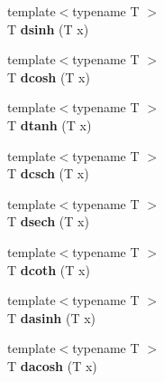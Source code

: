 \begin{DoxyCompactItemize}
\item 
\hypertarget{namespace_d_r_d_s_p_a09e0111902206a404a6de12cacdeea61}{{\footnotesize template$<$typename T $>$ }\\T {\bfseries dsinh} (T x)}\label{namespace_d_r_d_s_p_a09e0111902206a404a6de12cacdeea61}

\item 
\hypertarget{namespace_d_r_d_s_p_a5a63f17784421984c84b9dba3b51173f}{{\footnotesize template$<$typename T $>$ }\\T {\bfseries dcosh} (T x)}\label{namespace_d_r_d_s_p_a5a63f17784421984c84b9dba3b51173f}

\item 
\hypertarget{namespace_d_r_d_s_p_a46144486b16116ea73799ce0244b82ff}{{\footnotesize template$<$typename T $>$ }\\T {\bfseries dtanh} (T x)}\label{namespace_d_r_d_s_p_a46144486b16116ea73799ce0244b82ff}

\item 
\hypertarget{namespace_d_r_d_s_p_a7ca494bf06101b90a9ae64958f89ad4b}{{\footnotesize template$<$typename T $>$ }\\T {\bfseries dcsch} (T x)}\label{namespace_d_r_d_s_p_a7ca494bf06101b90a9ae64958f89ad4b}

\item 
\hypertarget{namespace_d_r_d_s_p_a57a0e300085b72bc5ba852c4ff109c99}{{\footnotesize template$<$typename T $>$ }\\T {\bfseries dsech} (T x)}\label{namespace_d_r_d_s_p_a57a0e300085b72bc5ba852c4ff109c99}

\item 
\hypertarget{namespace_d_r_d_s_p_a7f24d239ca28caf3faf3f89e8fe19873}{{\footnotesize template$<$typename T $>$ }\\T {\bfseries dcoth} (T x)}\label{namespace_d_r_d_s_p_a7f24d239ca28caf3faf3f89e8fe19873}

\item 
\hypertarget{namespace_d_r_d_s_p_a970a0e0220f4584fe2b3cd20710aa117}{{\footnotesize template$<$typename T $>$ }\\T {\bfseries dasinh} (T x)}\label{namespace_d_r_d_s_p_a970a0e0220f4584fe2b3cd20710aa117}

\item 
\hypertarget{namespace_d_r_d_s_p_a06b305e94dd4ce0ed25dc098976cf6c5}{{\footnotesize template$<$typename T $>$ }\\T {\bfseries dacosh} (T x)}\label{namespace_d_r_d_s_p_a06b305e94dd4ce0ed25dc098976cf6c5}


\end{DoxyCompactItemize}
